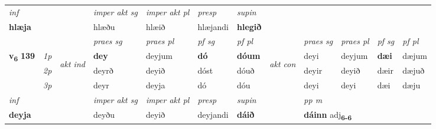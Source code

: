 \begin{longtable}[l]{X>{\footnotesize\itshape}llXXXXlXXXX}
   {\textit{inf}} & &  & \textit{imper akt sg} & \textit{imper akt pl}   & \textit{presp} & \textit{supin}   \\*
  {\textbf{hlæja}} & && hlæðu  & hlæið   & hlæjandi &  \textbf{hlegið}   \\*

\midrule

 & &   & \textit{praes sg}  & \textit{praes pl}    & \textit{ pf sg} & \textit{pf pl} & & \textit{praes sg}  & \textit{praes pl}    & \textit{pf sg} & \textit{pf pl }  \\ \cmidrule{4-7} \cmidrule{9-12}
 \multirow{2}{*}{{{\textbf{v{\textsubscript{6}}} \Large{\textbf{139}}}}}  & 1p & \multirow{3}{*}{\begin{turn}{90}\textit{akt ind}\end{turn}} & \textbf{dey} & deyjum & \textbf{dó} & \textbf{dóum} & \multirow{3}{*}{\begin{turn}{90}\textit{akt con}\end{turn}} &deyi & deyjum & \textbf{dæi} & dæjum\\*
 & 2p &  &  deyrð  & deyið & dóst & dóuð & & deyir & deyið & dæir & dæjuð \\*
 & 3p &  & deyr & deyja & dó & dóu & & deyi & deyi& dæi & dæju \\*
\cmidrule{4-7} \cmidrule{9-12}

   {\textit{inf}} & &  & \textit{imper akt sg} & \textit{imper akt pl}   & \textit{presp} & \textit{supin}  && \textit{pp m} \\*
  {\textbf{deyja}} & && deyðu  & deyið   & deyjandi &  \textbf{dáið}  && \multicolumn{2}{l}{\textbf{dáinn} adj\textbf{\textsubscript{6-6}}} \\*

\midrule


\end{longtable}
